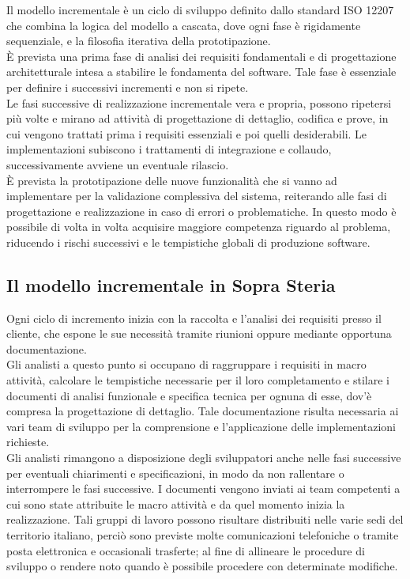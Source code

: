 	Il modello incrementale è un ciclo di sviluppo definito dallo standard ISO 12207 che combina la logica del modello a cascata, dove ogni fase è rigidamente sequenziale, e la filosofia iterativa della prototipazione.\\
	
	È prevista una prima fase di analisi dei requisiti fondamentali e di progettazione architetturale intesa a stabilire le fondamenta del software. Tale fase è essenziale per definire i successivi incrementi e non si ripete.\\
	
	Le fasi successive di realizzazione incrementale vera e propria, possono ripetersi più volte e mirano ad attività di progettazione di dettaglio,
	codifica e prove, in cui vengono trattati prima i requisiti essenziali e poi quelli desiderabili. Le implementazioni subiscono i trattamenti di 
	integrazione e collaudo, successivamente avviene un eventuale rilascio.\\

	È prevista la prototipazione delle nuove funzionalità che si vanno ad implementare per la validazione complessiva del sistema, reiterando 
	alle fasi di progettazione e realizzazione in caso di errori o problematiche. In questo modo è possibile di volta in volta acquisire maggiore competenza riguardo al problema, riducendo i rischi successivi e le tempistiche globali di produzione software.
	
	\subsection{Il modello incrementale in Sopra Steria}
	
	Ogni ciclo di incremento inizia con la raccolta e l'analisi dei requisiti presso il cliente, che espone le sue necessità tramite riunioni oppure mediante opportuna documentazione.\\
	
	Gli analisti a questo punto si occupano di raggruppare i requisiti in macro attività, calcolare le tempistiche necessarie per il loro completamento e stilare i documenti di analisi funzionale e specifica tecnica per ognuna di esse, dov'è compresa la progettazione di dettaglio. Tale documentazione risulta necessaria ai vari team di sviluppo per la comprensione e l'applicazione delle implementazioni richieste.\\
	
	Gli analisti rimangono a disposizione degli sviluppatori anche nelle fasi successive per eventuali chiarimenti e specificazioni, in modo da non rallentare o interrompere le fasi successive. I documenti vengono inviati ai team competenti a cui sono state attribuite le macro attività e da quel momento inizia la realizzazione. Tali gruppi di lavoro possono risultare distribuiti nelle varie sedi del territorio italiano, perciò sono previste molte comunicazioni telefoniche o tramite posta elettronica e occasionali trasferte; al fine di allineare le procedure di sviluppo o rendere noto quando è possibile procedere con determinate modifiche. \\
	
